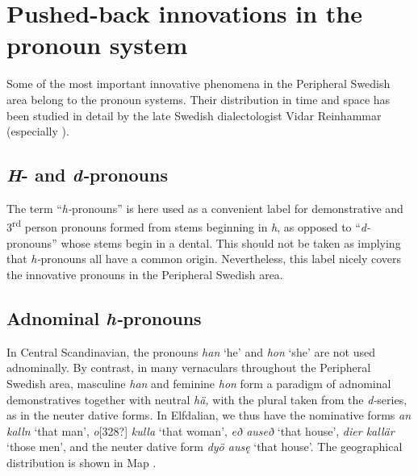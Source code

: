 \section{Pushed-back innovations in the pronoun system}

\begin{styleBodyTextFirst}
Some of the most important innovative phenomena in the Peripheral Swedish area belong to the pronoun systems. Their distribution in time and space has been studied in detail by the late Swedish dialectologist Vidar Reinhammar (especially \citet{Reinhammar1975}). 

\end{styleBodyTextFirst}

\subsection{\textit{H}{}- and \textit{d-}pronouns}

\begin{styleBodyTextFirst}
The term “\textit{h-}pronouns” is here used as a convenient label for demonstrative and 3\textsuperscript{rd} person pronouns formed from stems beginning in \textit{h}, as opposed to “\textit{d-}pronouns” whose stems begin in a dental. This should not be taken as implying that \textit{h-}pronouns all have a common origin. Nevertheless, this label nicely covers the innovative pronouns in the Peripheral Swedish area.

\end{styleBodyTextFirst}

\subsection{Adnominal \textit{h-}pronouns}

\begin{styleBodyTextFirst}
In Central Scandinavian, the pronouns \textit{han} ‘he’ and \textit{hon} ‘she’ are not used adnominally. By contrast, in many vernaculars throughout the Peripheral Swedish area, masculine \textit{han} and feminine \textit{hon} form a paradigm of adnominal demonstratives together with neutral \textit{hä, }with the plural taken from the \textit{d-}series, as in the neuter dative forms\textit{. }In Elfdalian, we thus have the nominative forms \textit{an kalln} ‘that man’, \textit{o}[328?]\textit{ kulla} ‘that woman’, \textit{eð auseð} ‘that house’, \textit{dier kallär} ‘those men’, and the neuter dative form \textit{dyö ausę }‘that house’. The geographical distribution is shown in Map . 

\end{styleBodyTextFirst}

